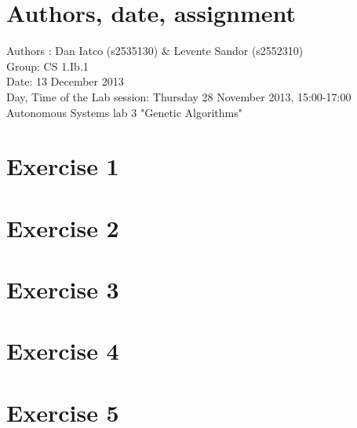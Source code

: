 \documentclass[a4paper,10pt]{article}
\begin{document}
\section*{Authors, date, assignment}
Authors : Dan Iatco (s2535130) \& Levente Sandor (s2552310)\\
Group: CS 1.Ib.1\\
Date:  13 December 2013\\
Day, Time of the Lab session: Thursday 28 November 2013, 15:00-17:00\\
Autonomous Systems lab 3 "Genetic Algorithms"\\

\section*{Exercise 1}


\section*{Exercise 2}


\section*{Exercise 3}


\section*{Exercise 4}


\section*{Exercise 5}
\end{document}
